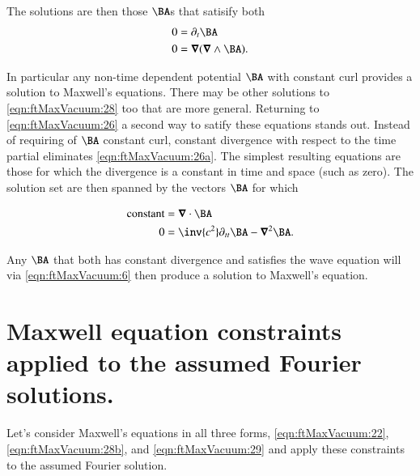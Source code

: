 The solutions are then those $\BA$s that satisify both
\begin{subequations}
\label{eqn:ftMaxVacuum:28b}
\begin{align}
0 &= \partial_t \BA \\
0 &= \spacegrad (\spacegrad \wedge \BA).
\end{align}
\end{subequations}

In particular any non-time dependent potential $\BA$ with constant curl provides a solution to Maxwell's equations.  There may be other solutions to \autoref{eqn:ftMaxVacuum:28} too that are more general.  Returning to \autoref{eqn:ftMaxVacuum:26} a second way to satify these equations stands out.  Instead of requiring of $\BA$ constant curl, constant divergence with respect to the time partial eliminates \autoref{eqn:ftMaxVacuum:26a}.  The simplest resulting equations are those for which the divergence is a constant in time and space (such as zero).  The solution set are then spanned by the vectors $\BA$ for which

\begin{subequations}
\label{eqn:ftMaxVacuum:29}
\begin{align}
\text{constant} &= \spacegrad \cdot \BA \\
0 &= \inv{c^2} \partial_{tt} \BA - \spacegrad^2 \BA.
\end{align}
\end{subequations}

Any $\BA$ that both has constant divergence and satisfies the wave equation will via \autoref{eqn:ftMaxVacuum:6} then produce a solution to Maxwell's equation.


\section{Maxwell equation constraints applied to the assumed Fourier solutions.}

Let's consider Maxwell's equations in all three forms, \autoref{eqn:ftMaxVacuum:22}, \autoref{eqn:ftMaxVacuum:28b}, and \autoref{eqn:ftMaxVacuum:29} and apply these constraints to the assumed Fourier solution.

